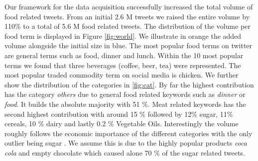 \documentclass[12pt]{report}
\begin{document}
Our framework for the data acquisition successfully increased the total volume of food related tweets. From an initial 2.6 M tweets we raised the entire volume by 110\% to a total of 5.6 M food related tweets. The distribution of the volume per food term is displayed in Figure \ref{fig:world}. We illustrate in orange the added volume alongside the initial size in blue. The most popular food terms on twitter are general terms such as food, dinner and lunch. Within the 10 most popular terms we found that three beverages (coffee, beer, tea) were represented. The most popular traded commodity term on social media is chicken.  We further show the distribution of the categories in \ref{fig:cat}. By far the highest contribution has the category \emph{others} due to general food related keywords such as \emph{dinner} or \emph{food}. It builds the absolute majority with 51 \%. Meat related keywords has the second highest contribution with around 15 \% followed by 12\% sugar, 11\%  cereals, 10 \% dairy  and lastly 0.2 \% Vegetable Oils. Interestingly the volume roughly follows the economic importance of the different categories with the only outlier being sugar \cite{fao2008}. We assume this is due to the highly popular products \emph{coca cola} and empty	{chocolate} which caused alone 70 \% of the sugar related tweets. 
\end{document}
